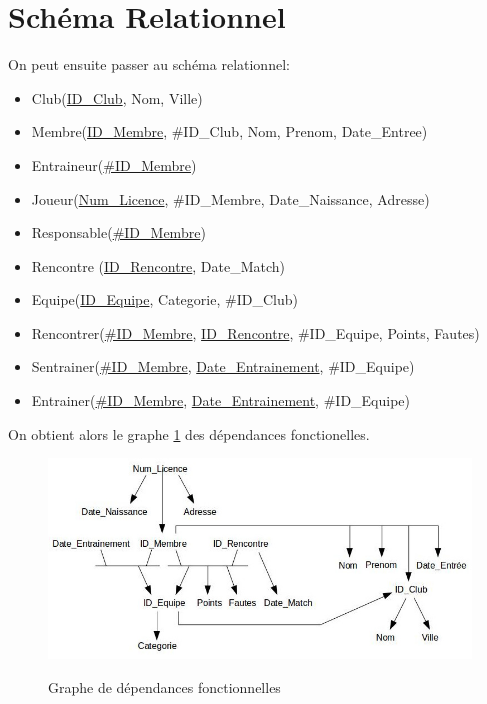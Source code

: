 \documentclass[a4paper,8pt,french,fleqn]{report}
\begin{document}
\section{Schéma Relationnel}

On peut ensuite passer au schéma relationnel: \\

\begin{itemize}

\item Club(\underline{ID\_Club}, Nom, Ville)  
\item Membre(\underline{ID\_Membre}, \#ID\_Club, Nom, Prenom, Date\_Entree) 
\item Entraineur(\underline{\#ID\_Membre}) 
\item Joueur(\underline{Num\_Licence}, \#ID\_Membre, Date\_Naissance, Adresse) 
\item Responsable(\underline{\#ID\_Membre}) 
\item Rencontre (\underline{ID\_Rencontre}, Date\_Match) 
\item Equipe(\underline{ID\_Equipe}, Categorie, \#ID\_Club) 
\item Rencontrer(\underline{\#ID\_Membre}, \underline{ID\_Rencontre}, \#ID\_Equipe, Points, Fautes) 
\item Sentrainer(\underline{\#ID\_Membre}, \underline{Date\_Entrainement}, \#ID\_Equipe) 
\item Entrainer(\underline{\#ID\_Membre}, \underline{Date\_Entrainement}, \#ID\_Equipe) \\

\end{itemize}

On obtient alors le graphe \ref{fig:depfct} des dépendances fonctionelles.

\begin{figure}[h]
  \centering
    \includegraphics[scale=0.35]{DepFct.jpeg}
    \label{fig:depfct}
    \caption{Graphe de dépendances fonctionnelles}
\end{figure}
\end{document}
